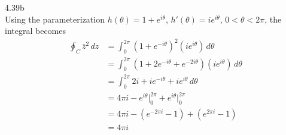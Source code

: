 \documentclass{article}
\theoremstyle{definition}
\begin{document}
	\begin{prob}{4.39b} $  $ \vspace{2mm} \\
		Using the parameterization $ h(\theta) = 1 + e^{i\theta}, \, h'(\theta) = ie^{i\theta}, \, 0<\theta<2\pi $, the integral becomes
		\begin{align*}
			\oint_C \bar{z}^2 \, dz &= \int_{0}^{2\pi} \left( 1 + e^{-i\theta} \right)^2 \left( ie^{i\theta} \right) \, d\theta \\
			&= \int_{0}^{2\pi} \left( 1 + 2e^{-i\theta} + e^{-2i\theta} \right) \left( ie^{i\theta} \right) \, d\theta \\
			&= \int_{0}^{2\pi} 2i + ie^{-i\theta} + ie^{i\theta} \, d\theta \\
			&= 4\pi i - e^{i\theta} \Big|_{0}^{2\pi} + e^{i\theta} \Big|_{0}^{2\pi} \\
			&= 4\pi i - \left( e^{-2\pi i}-1 \right) + \left( e^{2\pi i} - 1 \right) \\
			&= \boxed{4\pi i}
		\end{align*}
	\end{prob}


    
    
\end{document}
